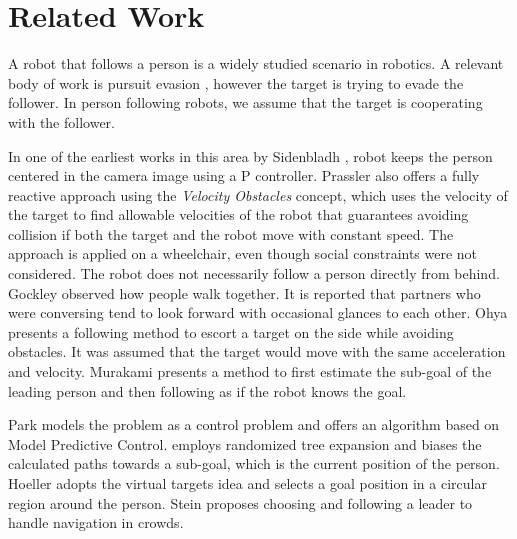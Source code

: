 \section{Related Work}
\label{sec:following_related_work}

A robot that follows a person is a widely studied scenario in robotics. A relevant body of work is pursuit evasion \cite{chung2011search}, however the target is trying to evade the follower. In person following robots, we assume that the target is cooperating with the follower.

In one of the earliest works in this area by Sidenbladh \cite{sidenbladh1999person}, robot keeps the person centered in the camera image using a P controller. Prassler \cite{prassler2001motion} also offers a fully reactive approach using the \textit{Velocity Obstacles} concept, which uses the velocity of the target to find allowable velocities of the robot that guarantees avoiding collision if both the target and the robot move with constant speed. The approach is applied on a wheelchair, even though social constraints were not considered. 
The robot does not necessarily follow a person directly from behind. Gockley \cite{gockley2007developing} observed how people walk together. It is reported that partners who were conversing tend to look forward with occasional glances to each other. Ohya \cite{ohya2002intelligent} presents a following method to escort a target on the side while avoiding obstacles. It was assumed that the target would move with the same acceleration and velocity. Murakami \cite{murakami2014destination} presents a method to first estimate the sub-goal of the leading person and then following as if the robot knows the goal. 

Park \cite{park2013autonomous} models the problem as a control problem and offers an algorithm based on Model Predictive Control.
\cite{miura2010development} employs randomized tree expansion and biases the calculated paths towards a sub-goal, which is the current position of the person. Hoeller \cite{hoeller2007accompanying} adopts the virtual targets idea and selects a goal position in a circular region around the person. Stein \cite{stein2013navigating} proposes choosing and following a leader to handle navigation in crowds.

